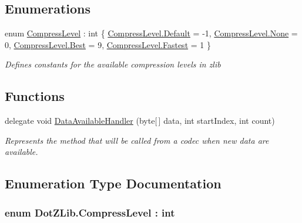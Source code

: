 \subsection*{Enumerations}
\begin{DoxyCompactItemize}
\item 
enum \hyperlink{namespace_dot_z_lib_a034f7a1ef9856d8834e6f6b1c53d8a4c}{Compress\+Level} \+: int \{ \hyperlink{namespace_dot_z_lib_a034f7a1ef9856d8834e6f6b1c53d8a4ca7a1920d61156abc05a60135aefe8bc67}{Compress\+Level.\+Default} = -\/1, 
\hyperlink{namespace_dot_z_lib_a034f7a1ef9856d8834e6f6b1c53d8a4ca6adf97f83acf6453d4a6a4b1070f3754}{Compress\+Level.\+None} = 0, 
\hyperlink{namespace_dot_z_lib_a034f7a1ef9856d8834e6f6b1c53d8a4ca68ef004de6166492c1d668eb8efe09bd}{Compress\+Level.\+Best} = 9, 
\hyperlink{namespace_dot_z_lib_a034f7a1ef9856d8834e6f6b1c53d8a4ca90fd7fdf6f41406a75e5265b9583bb4e}{Compress\+Level.\+Fastest} = 1
 \}
\begin{DoxyCompactList}\small\item\em Defines constants for the available compression levels in zlib \end{DoxyCompactList}\end{DoxyCompactItemize}
\subsection*{Functions}
\begin{DoxyCompactItemize}
\item 
delegate void \hyperlink{namespace_dot_z_lib_a3aa323950a96dc02f6b94462d498bfef}{Data\+Available\+Handler} (byte\mbox{[}$\,$\mbox{]} data, int start\+Index, int count)
\begin{DoxyCompactList}\small\item\em Represents the method that will be called from a codec when new data are available. \end{DoxyCompactList}\end{DoxyCompactItemize}


\subsection{Enumeration Type Documentation}
\hypertarget{namespace_dot_z_lib_a034f7a1ef9856d8834e6f6b1c53d8a4c}{
\subsubsection[{Compress\+Level}]{\setlength{\rightskip}{0pt plus 5cm}enum {\bf Dot\+Z\+Lib.\+Compress\+Level} \+: int}}\label{namespace_dot_z_lib_a034f7a1ef9856d8834e6f6b1c53d8a4c}


